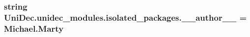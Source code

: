 \subsubsection[{\+\_\+\+\_\+author\+\_\+\+\_\+}]{\setlength{\rightskip}{0pt plus 5cm}string Uni\+Dec.\+unidec\+\_\+modules.\+isolated\+\_\+packages.\+\_\+\+\_\+author\+\_\+\+\_\+ = \textquotesingle{}Michael.\+Marty\textquotesingle{}}\label{namespace_uni_dec_1_1unidec__modules_1_1isolated__packages_a2eed3de65e98ebbabd5fec721d15911c}
